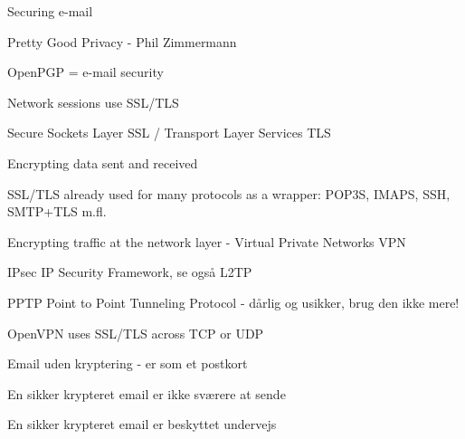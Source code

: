 \documentclass[Screen16to9,17pt]{foils}
\begin{document}

\begin{list1}
\item Securing e-mail
\begin{list2}
\item Pretty Good Privacy - Phil Zimmermann
\item OpenPGP = e-mail security
\end{list2}
\item Network sessions use SSL/TLS
\begin{list2}
\item Secure Sockets Layer SSL / Transport Layer Services TLS
\item Encrypting data sent and received
\item SSL/TLS already used for many protocols as a wrapper: POP3S, IMAPS, SSH, SMTP+TLS m.fl.
\end{list2}
\item Encrypting traffic at the network layer - Virtual Private Networks VPN
\begin{list2}
\item {\color{green}IPsec IP Security Framework, se også L2TP}
\item {\color{red} PPTP Point to Point Tunneling Protocol - dårlig og usikker, brug den ikke mere!}
\item OpenVPN uses SSL/TLS across TCP or UDP
\end{list2}
\end{list1}



\centerline{Email uden kryptering - er som et postkort}






\centerline{En sikker krypteret email er ikke sværere at sende}



\centerline{En sikker krypteret email er beskyttet undervejs}



\end{document}
